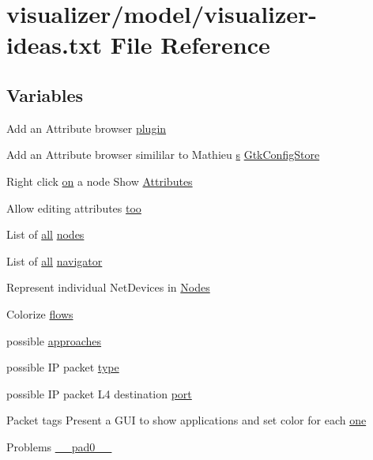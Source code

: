 \hypertarget{visualizer-ideas_8txt}{}\section{visualizer/model/visualizer-\/ideas.txt File Reference}
\label{visualizer-ideas_8txt}
\subsection*{Variables}
\begin{DoxyCompactItemize}
\item 
Add an Attribute browser \hyperlink{visualizer-ideas_8txt_a82212ee380150b652f4dad598413d06f}{plugin}
\item 
Add an Attribute browser simililar to Mathieu \hyperlink{generate__test__data__lte__sinr_8m_ad83eeb3a142285d1243a08c6b7026df8}{s} \hyperlink{visualizer-ideas_8txt_a1b913af5cf121089e2b4e9064cebf2c0}{Gtk\+Config\+Store}
\item 
Right click \hyperlink{lte__link__budget__x2__handover__measures_8m_ac88aa5a5c67076097e4a0e87a0709ea0}{on} a node Show \hyperlink{visualizer-ideas_8txt_a27e1a6a8cbd759bee727337ffe91cc2f}{Attributes}
\item 
Allow editing attributes \hyperlink{visualizer-ideas_8txt_af3c3e8ac1567983a64bb824e578019e2}{too}
\item 
List of \hyperlink{mmwave_2model_2fading-traces_2fading__trace__generator_8m_a00a349297fa58bc80ff5329e25dcfe28}{all} \hyperlink{visualizer-ideas_8txt_a3e1b3808014a2c68ab0cd0182e041be2}{nodes}
\item 
List of \hyperlink{mmwave_2model_2fading-traces_2fading__trace__generator_8m_a00a349297fa58bc80ff5329e25dcfe28}{all} \hyperlink{visualizer-ideas_8txt_a8254fefcfdbcd9f30e192a246998dd21}{navigator}
\item 
Represent individual Net\+Devices in \hyperlink{visualizer-ideas_8txt_a60b6e773372ae7bea1fe2f0a8246e881}{Nodes}
\item 
Colorize \hyperlink{visualizer-ideas_8txt_af5406187248505d2f882ff6cfadfc309}{flows}
\item 
possible \hyperlink{visualizer-ideas_8txt_ae3bafeabad5c7ac25038c924bd4a4420}{approaches}
\item 
possible IP packet \hyperlink{visualizer-ideas_8txt_add98db9e15e2a58cf2b57623e7aa893a}{type}
\item 
possible IP packet L4 destination \hyperlink{visualizer-ideas_8txt_a21ff1c530daf8435e00048b7fc2c58e3}{port}
\item 
Packet tags Present a G\+UI to show applications and set color for each \hyperlink{visualizer-ideas_8txt_a0a84c3fa82a58d60404416317320714e}{one}
\item 
Problems \hyperlink{visualizer-ideas_8txt_a2ea92441f3480b3eb9579ff262e635a0}{\+\_\+\+\_\+pad0\+\_\+\+\_\+}
\end{DoxyCompactItemize}


